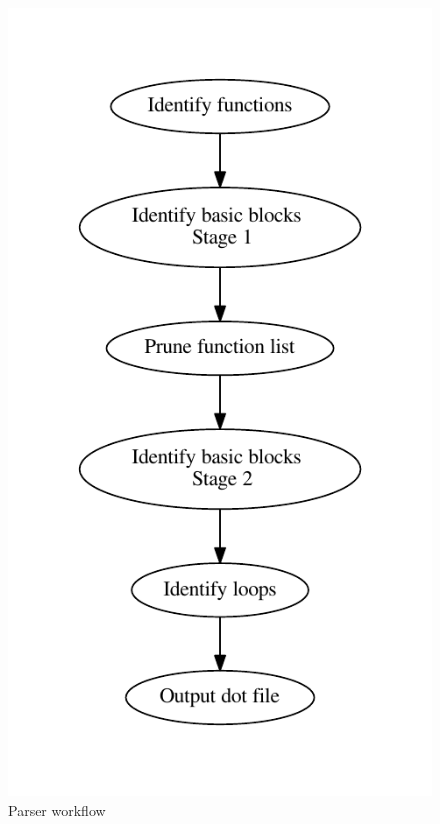 \documentclass[table,11pt]{article}
\begin{document}
\begin{figure} 
\centering
\includegraphics[scale=0.6]{figures/parse_flow.pdf}
\caption{Parser workflow}
\label{f:parse_flow}
\end{figure}
\end{document}
